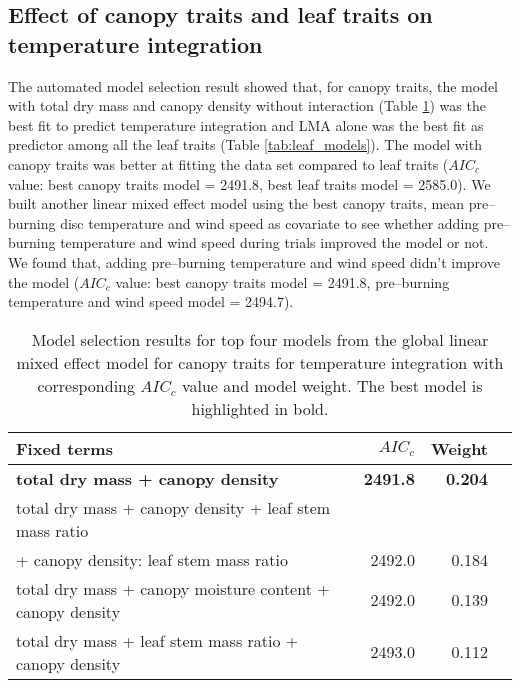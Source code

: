 \documentclass{bmcart}
\begin{document}
\subsection*{Effect of canopy traits and leaf traits on temperature integration}
The automated model selection result showed that, for canopy traits, the model with total dry mass and canopy density without interaction (Table \ref{tab:canopy_models}) was the best fit to predict temperature integration and \MakeUppercase{lma} alone was the best fit as predictor among all the leaf traits (Table \ref{tab:leaf_models}). The model with canopy traits was better at fitting the data set compared to leaf traits ($AIC_{c}$ value: best canopy traits model = 2491.8, best leaf traits model = 2585.0). We built another linear mixed effect model using the best canopy traits, mean pre--burning disc temperature and wind speed as  covariate to see whether adding pre--burning temperature and wind speed during trials improved the model or not. We found that, adding pre--burning temperature and wind speed didn't improve the model ($AIC_{c}$ value: best canopy traits model = 2491.8, pre--burning temperature and wind speed model = 2494.7).
\begin{table}
  \centering
  \caption{Model selection results for top four models from the global linear
    mixed effect model for canopy traits for temperature integration with
    corresponding $AIC_{c}$ value and model weight. The best model is highlighted in bold.}
  \begin{tabular}{lrrr}
    \toprule
    \textbf{Fixed terms} & \textbf{$AIC_{c}$} & \textbf{Weight}\\
    \midrule
    \textbf{total dry mass + canopy density}    & \textbf{2491.8} &  \textbf{0.204}\\
    total dry mass + canopy density + leaf stem mass ratio \\+ canopy density: leaf stem mass ratio & 2492.0  & 0.184 \\
    total dry mass + canopy moisture content + canopy density   & 2492.0   & 0.139 \\ 
    total dry mass + leaf stem mass ratio + canopy density  & 2493.0 & 0.112  \\
    \bottomrule
  \end{tabular}
  \label{tab:canopy_models}
\end{table}
\end{document}
